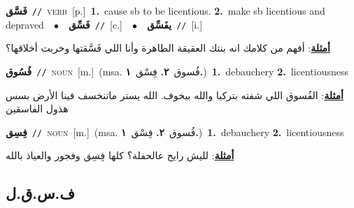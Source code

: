 \documentclass[10pt,a4paper,twoside]{article} %
\begin{document}
\begin{multicols}{2}
{\setlength\topsep{0pt}\textbf{\foreignlanguage{arabic}{فَسَّق}}\ {\color{gray}\texttt{//}\color{black}}\ \textsc{verb}\ [p.]\ \textbf{1.}~cause sb to be licentious.  \textbf{2.}~make sb licentious and depraved\ \ $\bullet$\ \ \setlength\topsep{0pt}\textbf{\foreignlanguage{arabic}{فَسِّق}}\ {\color{gray}\texttt{//}\color{black}}\ [c.]\ \ $\bullet$\ \ \setlength\topsep{0pt}\textbf{\foreignlanguage{arabic}{يفَسِّق}}\ {\color{gray}\texttt{//}\color{black}}\ [i.]\  \begin{flushright}\color{gray}\foreignlanguage{arabic}{\textbf{\underline{\foreignlanguage{arabic}{أمثلة}}}: أفهم من كلامك انه بنتك العقيقة الطاهرة وأنا اللي فَسَّقتها وخربت أخلاقها؟}\end{flushright}\color{black}} \vspace{2mm}

{\setlength\topsep{0pt}\textbf{\foreignlanguage{arabic}{فُسُوق}}\ {\color{gray}\texttt{//}\color{black}}\ \textsc{noun}\ [m.]\ \color{gray}(msa. \foreignlanguage{arabic}{فُسوق}~\foreignlanguage{arabic}{\textbf{٢.}}  \foreignlanguage{arabic}{فِسْق}~\foreignlanguage{arabic}{\textbf{١.}})\color{black}\ \textbf{1.}~debauchery  \textbf{2.}~licentiousness\  \begin{flushright}\color{gray}\foreignlanguage{arabic}{\textbf{\underline{\foreignlanguage{arabic}{أمثلة}}}: الفُسوق اللي شفته بتركيا والله بيخوف. الله يستر ماتنخسف فينا الأرض بسس هذول الفاسقين}\end{flushright}\color{black}} \vspace{2mm}

{\setlength\topsep{0pt}\textbf{\foreignlanguage{arabic}{فِسِق}}\ {\color{gray}\texttt{//}\color{black}}\ \textsc{noun}\ [m.]\ \color{gray}(msa. \foreignlanguage{arabic}{فُسوق}~\foreignlanguage{arabic}{\textbf{٢.}}  \foreignlanguage{arabic}{فِسْق}~\foreignlanguage{arabic}{\textbf{١.}})\color{black}\ \textbf{1.}~debauchery  \textbf{2.}~licentiousness\  \begin{flushright}\color{gray}\foreignlanguage{arabic}{\textbf{\underline{\foreignlanguage{arabic}{أمثلة}}}: لليش رايح عالحفلة؟ كلها فِسِق وفجور والعياذ بالله}\end{flushright}\color{black}} \vspace{2mm}

\vspace{-3mm}
\subsection*{\color{blue}\foreignlanguage{arabic}{ف.س.ق.ل}\color{blue}{}} 


\end{multicols}
\end{document}
